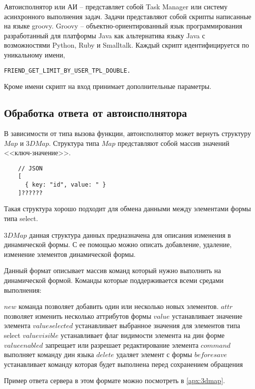 \documentclass[../index.tex]{subfiles}
\begin{document}
Автоисполнятор или АИ -- представляет собой Task Manager или систему асинхронного выполнения задач. 
Задачи представляют собой скрипты написанные на языке groovy. 
Groovy -- объектно-ориентированный язык программирования разработанный для платформы 
Java как альтернатива языку Java с возможностями Python, Ruby и Smalltalk. 
Каждый скрипт идентифицируется по уникальному имени,
\begin{verbatim}
FRIEND_GET_LIMIT_BY_USER_TPL_DOUBLE. 
\end{verbatim}

Кроме имени скрипт на вход принимает дополнительные параметры. 

\subsection{Обработка ответа от автоисполнятора}

В зависимости от типа вызова функции, автоисполнятор может вернуть структуру $Map$ и $3DMap$.
Структура типа $Map$ представляют собой массив значений <<ключ-значение>>.

\begin{verbatim}
    // JSON 
    [
      { key: "id", value: " }
    ]??????
\end{verbatim}

Такая структура хорошо подходит для обмена данными между элементами формы типа select.

$3DMap$ данная структура данных предназначена для описания изменения в динамической формы.
С ее помощью можно описать добавление, удаление, изменение элементов динамической формы.

Данный формат описывает массив команд который нужно выполнить на динамической формой.
Команды которые поддерживается всеми средами выполнения:

$new$ команда позволяет добавить один или несколько новых элементов.
$attr$ позволяет изменить несколько аттрибутов формы
$value$ устанавливает значение элемента
$valueselected$ устанавливает выбранное значения для элементов типа select
$valuevisible$ устанавливает флаг видимости элемента на дин форме
$valueenabled$ запрещает или разрешает редактирование элемента
$command$ выполняет команду дин языка
$delete$ удаляет элемент с формы
$beforesave$ устанавливает команду которая будет выполнена перед сохранением обращения

Пример ответа сервера в этом формате можно посмотреть в \autoref{apx:3dmap}.
\end{document}
